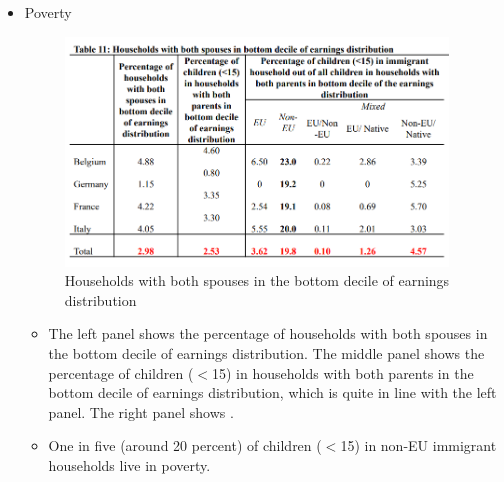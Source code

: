 \begin{itemize}
\item Poverty
\begin{figure}[H]
                \centering
                \includegraphics[width=4in]{images/ch11/11.png}
                \caption{Households with both spouses in the bottom decile of earnings distribution}
            \end{figure}
  \begin{itemize}
    \item The left panel shows the percentage of households with both spouses in the bottom decile of earnings distribution. The middle panel shows the percentage of children ($<$15) in households with both parents in the bottom decile of earnings distribution, which is quite in line with the left panel. The right panel shows .      
    \item One in five (around 20 percent) of children ($<$15) in non-EU immigrant households live in poverty.
\end{itemize}

\end{itemize}
   
